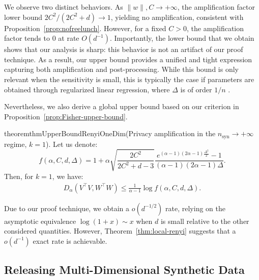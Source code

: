 \documentclass{article}
\theoremstyle{plain}
\theoremstyle{definition}
\theoremstyle{remark}
\begin{document}
We observe two distinct behaviors. As $\|w\|, C \to +\infty$, the amplification factor lower bound $2C^2/(2C^2 + d)\to 1$, yielding no amplification, consistent with Proposition~\ref{prop:nofreelunch}. However, for a fixed $C > 0$, the amplification factor tends to $0$ at rate $O(d^{-1})$.  Importantly, the lower bound that we obtain shows that our analysis is sharp: this behavior is not an artifact of our proof technique. As a result, our upper bound provides a unified and tight expression capturing both amplification and post-processing. While this bound is only relevant when the sensitivity is small, this is typically the case if parameters are obtained through regularized linear regression, where $\Delta$ is of order $1/n$ \citep{chaudhuri2011differentiallyprivateempiricalrisk}. 

Nevertheless, we also derive a global upper bound based on our criterion in Proposition~\ref{prop:Fisher-upper-bound}.
\begin{restatable}{theorem}{thmUpperBoundRenyiOneDim}\normalfont (Privacy amplification in the $n_{\mathrm{syn}} \to + \infty$ regime, $k=1$).
\label{thm:upper-bound-renyi-one-dim}
Let us denote: \[f(\alpha, C,d,\Delta) = 1+\alpha \sqrt{\frac{2C^2}{2C^2 + d-3}}\frac{e^{(\alpha-1) (2\alpha-1) \frac{\Delta^2}{2}} -1}{(\alpha-1)(2\alpha-1)\Delta}.\]
 Then, for $k=1$, we have:
    \begin{align*}
        D_\alpha(V^\top V,W^\top W) 
        \leq \frac{1}{\alpha-1}\log f(\alpha,C,d,\Delta).
    \end{align*}
\end{restatable}

Due to our proof technique, we obtain a $o(d^{-1/2})$ rate, relying on the asymptotic equivalence $\log(1+x) \sim x$ when $d$ is small relative to the other considered quantities. However, Theorem~\ref{thm:local-renyi} suggests that a $o(d^{-1})$ exact rate is achievable. 


\subsection{Releasing Multi-Dimensional Synthetic Data}
\label{sec:multilinear-regression}
\end{document}
